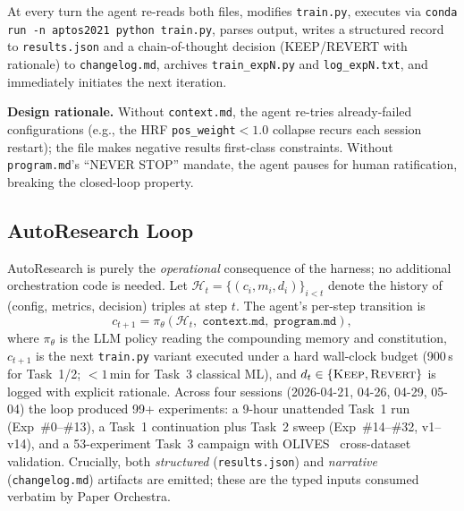 \documentclass{article}
\begin{document}
At every turn the agent re-reads both files, modifies \texttt{train.py}, executes via \texttt{conda run -n aptos2021 python train.py}, parses output, writes a structured record to \texttt{results.json} and a chain-of-thought decision (KEEP/REVERT with rationale) to \texttt{changelog.md}, archives \texttt{train\_expN.py} and \texttt{log\_expN.txt}, and immediately initiates the next iteration.

\textbf{Design rationale.} Without \texttt{context.md}, the agent re-tries already-failed configurations (e.g., the HRF \texttt{pos\_weight}$<\!1.0$ collapse recurs each session restart); the file makes negative results first-class constraints. Without \texttt{program.md}'s ``NEVER STOP'' mandate, the agent pauses for human ratification, breaking the closed-loop property.

\subsection{AutoResearch Loop}
\label{sec:autoresearch}
AutoResearch is purely the \emph{operational} consequence of the harness; no additional orchestration code is needed. Let $\mathcal{H}_t = \{(c_i, m_i, d_i)\}_{i<t}$ denote the history of (config, metrics, decision) triples at step $t$. The agent's per-step transition is
\begin{equation}
    c_{t+1} = \pi_\theta\!\left(\mathcal{H}_t,\;\texttt{context.md},\;\texttt{program.md}\right),
    \label{eq:loop}
\end{equation}
where $\pi_\theta$ is the LLM policy reading the compounding memory and constitution, $c_{t+1}$ is the next \texttt{train.py} variant executed under a hard wall-clock budget (900\,s for Task~1/2; ${<}1$\,min for Task~3 classical ML), and $d_t \in \{\textsc{Keep}, \textsc{Revert}\}$ is logged with explicit rationale. Across four sessions (2026-04-21, 04-26, 04-29, 05-04) the loop produced 99+ experiments: a 9-hour unattended Task~1 run (Exp~\#0--\#13), a Task~1 continuation plus Task~2 sweep (Exp~\#14--\#32, v1--v14), and a 53-experiment Task~3 campaign with OLIVES~\cite{Prabhushankar2022OLIVES} cross-dataset validation. Crucially, both \emph{structured} (\texttt{results.json}) and \emph{narrative} (\texttt{changelog.md}) artifacts are emitted; these are the typed inputs consumed verbatim by Paper Orchestra.
\end{document}
